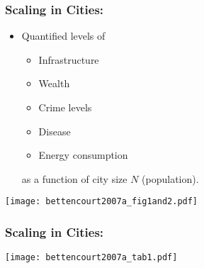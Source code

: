 \begin{frame}
  \frametitle{Scaling in Cities:}

  \begin{block}{}
    \begin{itemize}
    \item  Quantified levels of 
      \begin{itemize}
      \item Infrastructure
      \item Wealth
      \item Crime levels
      \item Disease
      \item Energy consumption
      \end{itemize}
      as a function of city size $N$ (population).
    \end{itemize}
  \end{block}

\end{frame}

\begin{frame}

  \begin{block}{}
    \texttt{[image: bettencourt2007a\_fig1and2.pdf]}
  \end{block}

\end{frame}

\begin{frame}
  \frametitle{Scaling in Cities:}

  \begin{block}{}
    \texttt{[image: bettencourt2007a\_tab1.pdf]}
  \end{block}

\end{frame}

